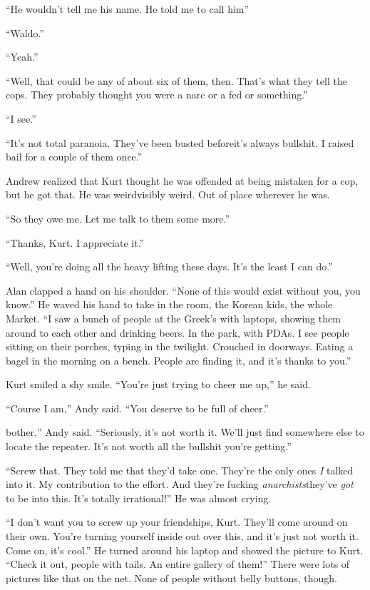 ``He wouldn't tell me his name.  He told me to call him\dash{}''

``Waldo.''

``Yeah.''

``Well, that could be any of about six of them, then.  That's what
they tell the cops.  They probably thought you were a narc or a fed or
something.''

``I see.''

``It's not total paranoia.  They've been busted before\dash{}it's always
bullshit.  I raised bail for a couple of them once.''

Andrew realized that Kurt thought he was offended at being mistaken
for a cop, but he got that.  He was weird\dash{}visibly weird.  Out of
place wherever he was.

``So they owe me.  Let me talk to them some more.''

``Thanks, Kurt.  I appreciate it.''

``Well, you're doing all the heavy lifting these days.  It's the least
I can do.''

Alan clapped a hand on his shoulder.  ``None of this would exist
without you, you know.'' He waved his hand to take in the room, the
Korean kids, the whole Market.  ``I saw a bunch of people at the
Greek's with laptops, showing them around to each other and drinking
beers.  In the park, with PDAs.  I see people sitting on their
porches, typing in the twilight.  Crouched in doorways.  Eating a
bagel in the morning on a bench.  People are finding it, and it's
thanks to you.''

Kurt smiled a shy smile.  ``You're just trying to cheer me up,'' he
said.

``Course I am,'' Andy said.  ``You deserve to be full of cheer.''

bother,''
Andy said.  ``Seriously, it's not worth it.  We'll
just find somewhere else to locate the repeater.  It's not worth all
the bullshit you're getting.''

``Screw that.  They told me that they'd take one.  They're the only
ones \textit{I} talked into it.  My contribution to the effort.  And
they're fucking \textit{anarchists}\dash{}they've \textit{got} to be into
this.  It's totally irrational!'' He was almost crying.

``I don't want you to screw up your friendships, Kurt.  They'll come
around on their own.  You're turning yourself inside out over this,
and it's just not worth it.  Come on, it's cool.'' He turned around
his laptop and showed the picture to Kurt.  ``Check it out, people
with tails.  An entire gallery of them!'' There were lots of pictures
like that on the net.  None of people without belly buttons, though.

